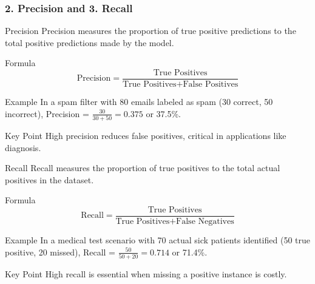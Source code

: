 \documentclass[aspectratio=169]{beamer}
\begin{document}
\begin{frame}[fragile]
    \frametitle{2. Precision and 3. Recall}
    \begin{block}{Precision}
        Precision measures the proportion of true positive predictions to the total positive predictions made by the model.
    \end{block}

    \begin{block}{Formula}
        \begin{equation}
        \text{Precision} = \frac{\text{True Positives}}{\text{True Positives} + \text{False Positives}}
        \end{equation}
    \end{block}

    \begin{block}{Example}
        In a spam filter with 80 emails labeled as spam (30 correct, 50 incorrect), Precision = \( \frac{30}{30 + 50} = 0.375 \) or 37.5\%.
    \end{block}

    \begin{block}{Key Point}
        High precision reduces false positives, critical in applications like diagnosis.
    \end{block}
    
    \begin{block}{Recall}
        Recall measures the proportion of true positives to the total actual positives in the dataset.
    \end{block}

    \begin{block}{Formula}
        \begin{equation}
        \text{Recall} = \frac{\text{True Positives}}{\text{True Positives} + \text{False Negatives}}
        \end{equation}
    \end{block}

    \begin{block}{Example}
        In a medical test scenario with 70 actual sick patients identified (50 true positive, 20 missed), Recall = \( \frac{50}{50 + 20} = 0.714 \) or 71.4\%.
    \end{block}
    
    \begin{block}{Key Point}
        High recall is essential when missing a positive instance is costly.
    \end{block}
\end{frame}
\end{document}
